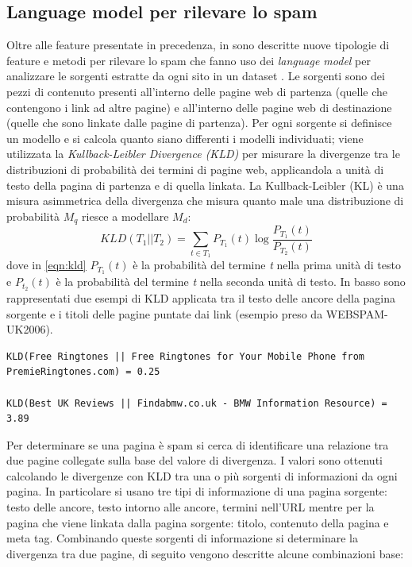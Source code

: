 \subsection{Language model per rilevare lo spam}
Oltre alle feature presentate in precedenza, in \cite{Martinez-Romo:2009:WSI:1531914.1531920} sono descritte nuove tipologie di feature e metodi per rilevare lo spam che fanno uso dei \textit{language model}  per analizzare le sorgenti estratte da ogni sito in un dataset . Le sorgenti sono dei pezzi di contenuto presenti all'interno delle pagine web di partenza (quelle che contengono i link ad altre pagine) e all'interno delle pagine web di destinazione (quelle che sono linkate dalle pagine di partenza). Per ogni sorgente si definisce un modello e si calcola quanto siano differenti i modelli individuati; viene utilizzata la \textit{Kullback-Leibler Divergence (KLD)} per misurare la divergenze tra le distribuzioni di probabilità dei termini di pagine web, applicandola a unità di testo della pagina di partenza e di quella linkata. La Kullback-Leibler (KL) è una misura  asimmetrica della divergenza che misura quanto male una distribuzione di probabilità \(M_q\) riesce a modellare \(M_d\):
\begin{equation}
KLD(T_1||T_2) = \sum_{t \in T_1} P_{T_1}(t) \log \frac{P_{T_1}(t)}{P_{T_2}(t)}
\label{eqn:kld}
\end{equation}
dove in \ref{eqn:kld} \(P_{T_1}(t)\) è la probabilità del termine \textit{t} nella prima unità di testo e \(P_{t_2}(t)\) è la probabilità del termine \textit{t} nella seconda unità di testo. In basso sono rappresentati due esempi di KLD applicata tra il testo delle ancore della pagina sorgente e i titoli delle pagine puntate dai link (esempio preso da WEBSPAM-UK2006).
\begin{lstlisting}[frame=trbl,postbreak=\space, breakindent=5pt, breaklines]
KLD(Free Ringtones || Free Ringtones for Your Mobile Phone from PremieRingtones.com) = 0.25

KLD(Best UK Reviews || Findabmw.co.uk - BMW Information Resource) = 3.89
\end{lstlisting}
Per determinare se una pagina è spam si cerca di identificare una relazione tra due pagine collegate sulla base del valore di divergenza. I valori sono ottenuti calcolando le divergenze con KLD tra una o più sorgenti di informazioni da ogni pagina. In particolare si usano tre tipi di informazione di una pagina sorgente: testo delle ancore, testo intorno alle ancore, termini nell'URL mentre per la pagina che viene linkata dalla pagina sorgente: titolo, contenuto della pagina e meta tag. Combinando queste sorgenti di informazione si determinare la divergenza tra due pagine, di seguito vengono descritte alcune combinazioni base:
